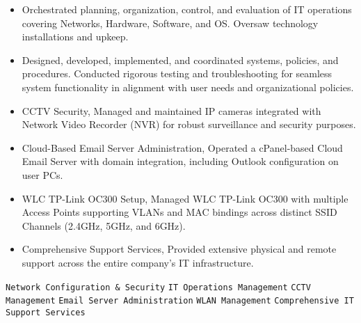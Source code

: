 \documentclass[9pt]{developercv} %
\begin{document}
\begin{entrylist}
{\begin{itemize}[noitemsep,topsep=0pt,parsep=0pt,partopsep=0pt, leftmargin=-1pt]
    \item Orchestrated planning, organization, control, and evaluation of IT operations covering Networks, Hardware, Software, and OS. Oversaw technology installations and upkeep.
    
    \item Designed, developed, implemented, and coordinated systems, policies, and procedures. Conducted rigorous testing and troubleshooting for seamless system functionality in alignment with user needs and organizational policies.
    
    \item CCTV Security, Managed and maintained IP cameras integrated with Network Video Recorder (NVR) for robust surveillance and security purposes.
    
    \item Cloud-Based Email Server Administration, Operated a cPanel-based Cloud Email Server with domain integration, including Outlook configuration on user PCs.
    
    \item WLC TP-Link OC300 Setup, Managed WLC TP-Link OC300 with multiple Access Points supporting VLANs and MAC bindings across distinct SSID Channels (2.4GHz, 5GHz, and 6GHz).
    
    \item Comprehensive Support Services, Provided extensive physical and remote support across the entire company's IT infrastructure.


        \end{itemize} 
        \texttt{Network Configuration \& Security} \slashsep \texttt{IT Operations Management}  \slashsep \texttt{CCTV Management} \slashsep \texttt{Email Server Administration} \slashsep \texttt{WLAN Management} \slashsep \texttt{Comprehensive IT Support Services}}


\end{entrylist}
\end{document}
